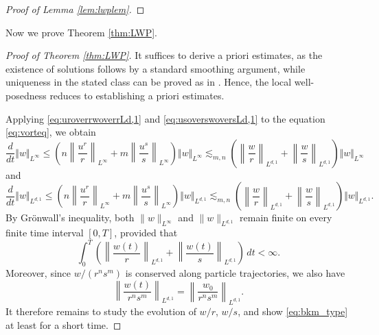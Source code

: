 \documentclass[11pt]{amsart}
\theoremstyle{definition}
\theoremstyle{remark}
\numberwithin{equation}{section}
\numberwithin{equation}{section}
\newcommand{\nrm}[1]{\Vert#1\Vert}
\newcommand{\br}[1]{\overline{#1}}
\newcommand{\0}{\emptyset}
\newcommand{\ift}{\infty}
\newcommand{\bbR}{\mathbb R}
\begin{document}
\begin{proof}[Proof of Lemma \ref{lem:lwplem}]

	\end{proof}
	
Now we prove Theorem \ref{thm:LWP}.
\begin{proof}[Proof of Theorem \ref{thm:LWP}]
It suffices to derive a priori estimates, as the existence of solutions follows by a standard smoothing argument, while uniqueness in the stated class can be proved as in \cite{Danaxi}. Hence, the local well-posedness reduces to establishing a priori estimates.

Applying \eqref{eq:uroverrwoverrLd,1} and \eqref{eq:usoverswoversLd,1} to the equation \eqref{eq:vorteq}, we obtain
\begin{equation}
	\frac{d}{dt}\nrm{w}_{L^{\ift}}\leq \left( n\left\| \frac{u^{r}}{r}\right\|_{L^{\ift}}+m\left\| \frac{u^{s}}{s}\right\|_{L^{\ift}}\right)\nrm{w}_{L^{\ift}}\lesssim_{m,n} \left( \left\| \frac{w}{r}\right\|_{L^{d,1}}+\left\| \frac{w}{s}\right\|_{L^{d,1}}\right)\nrm{w}_{L^{\ift}}
\end{equation}
and	
\begin{equation}
	\frac{d}{dt}\nrm{w}_{L^{d,1}}\leq \left( n\left\| \frac{u^{r}}{r}\right\|_{L^{\ift}}+m\left\| \frac{u^{s}}{s}\right\|_{L^{\ift}}\right)\nrm{w}_{L^{d,1}}\lesssim_{m,n} \left( \left\| \frac{w}{r}\right\|_{L^{d,1}}+\left\| \frac{w}{s}\right\|_{L^{d,1}}\right)\nrm{w}_{L^{d,1}}.
\end{equation}
By Gr\"{o}nwall's inequality, both $\|w\|_{L^{\infty}}$ and $\|w\|_{L^{d,1}}$ remain finite on every finite time interval $[0,T]$, provided that 
\begin{equation} \label{eq:bkm_type}
	\int_0^T \left( \left\|\frac{w(t)}{r}\right\|_{L^{d,1}} + \left\|\frac{w(t)}{s}\right\|_{L^{d,1}} \right)\,dt < \infty. 
\end{equation}
Moreover, since $w/(r^ns^m)$ is conserved along particle trajectories, we also have
\begin{equation}
	\left\| \frac{w(t)}{r^{n}s^{m}}\right\|_{L^{d,1}}=\left\| \frac{w_{0}}{r^{n}s^{m}}\right\|_{L^{d,1}}.
\end{equation}
It therefore remains to study the evolution of $w/r$, $w/s$, and show \eqref{eq:bkm_type} at least for a short time.


\end{proof}
\end{document}
